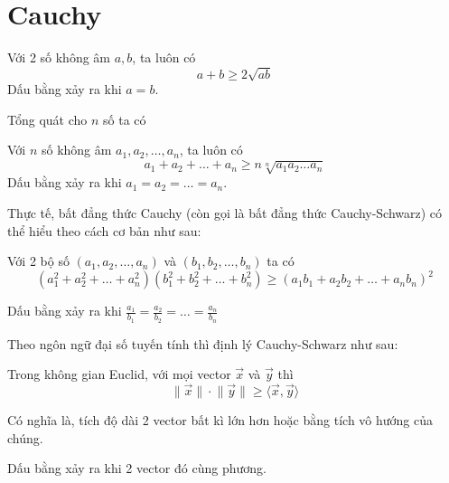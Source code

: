 \chapter{Cauchy}

\begin{theorem}
    Với 2 số không âm $a, b$, ta luôn có
    \[a+b \geq 2 \sqrt{ab}\]
    Dấu bằng xảy ra khi $a = b$.
\end{theorem}

Tổng quát cho $n$ số ta có

\begin{theorem}
    Với $n$ số không âm $a_1, a_2, \ldots, a_n$, ta luôn có
    \[a_1 + a_2 + \ldots + a_n \geq n \sqrt[n]{a_1 a_2 \ldots a_n}\]
    Dấu bằng xảy ra khi $a_1 = a_2 = \ldots = a_n$.
\end{theorem}

Thực tế, bất đẳng thức Cauchy (còn gọi là bất đẳng thức Cauchy-Schwarz) có thể hiểu theo cách cơ bản như sau:

\begin{theorem}
    Với 2 bộ số $(a_1, a_2, \ldots, a_n)$ và $(b_1, b_2, \ldots, b_n)$ ta có
    \[(a_1^2 + a_2^2 + \ldots + a_n^2) (b_1^2 + b_2^2 + \ldots + b_n^2) \geq (a_1 b_1 + a_2 b_2 + \ldots + a_n b_n)^2\]

    Dấu bằng xảy ra khi $\frac{a_1}{b_1} = \frac{a_2}{b_2} = \ldots = \frac{a_n}{b_n}$
\end{theorem}

Theo ngôn ngữ đại số tuyến tính thì định lý Cauchy-Schwarz như sau:

\begin{theorem}
    Trong không gian Euclid, với mọi vector $\vec{x}$ và $\vec{y}$ thì 
    \[\lVert \vec{x} \rVert \cdot \lVert \vec{y} \rVert \geq \langle \vec{x}, \vec{y} \rangle\]
    
    Có nghĩa là, tích độ dài 2 vector bất kì lớn hơn hoặc bằng tích vô hướng của chúng.

    Dấu bằng xảy ra khi 2 vector đó cùng phương.
\end{theorem}